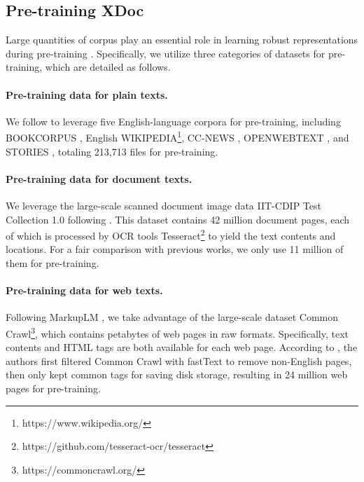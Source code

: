 \documentclass[11pt]{article}
\begin{document}
\subsection{Pre-training XDoc}
Large quantities of corpus play an essential role in learning robust representations during pre-training \cite{liu2019roberta}. Specifically, we utilize three categories of datasets for pre-training, which are detailed as follows.

\paragraph{Pre-training data for plain texts.} We follow \cite{liu2019roberta} to leverage five English-language corpora for pre-training, including B{\small OOK}C{\small ORPUS} \cite{zhu2015aligning}, English W{\small IKIPEDIA}\footnote{https://www.wikipedia.org/}, CC-N{\small EWS} \cite{ccnews}, O{\small PEN}W{\small EB}T{\small EXT} \cite{openweb}, and S{\small TORIES} \cite{trinh2018simple}, totaling 213,713 files for pre-training.

\paragraph{Pre-training data for document texts.} We leverage the large-scale scanned document image data IIT-CDIP Test Collection 1.0 \cite{lewis2006building} following \cite{xu2020layoutlm,xu2020layoutlmv2,huang2022layoutlmv3}. This dataset contains 42 million document pages, each of which is processed by OCR tools Tesseract\footnote{https://github.com/tesseract-ocr/tesseract} to yield the text contents and locations. For a fair comparison with previous works, we only use 11 million of them for pre-training.

\paragraph{Pre-training data for web texts.} Following MarkupLM \cite{li2021markuplm}, we take advantage of the large-scale dataset Common Crawl\footnote{https://commoncrawl.org/}, which contains petabytes of web pages in raw formats. Specifically, text contents and HTML tags are both available for each web page. According to \cite{li2021markuplm}, the authors first filtered Common Crawl with fastText \cite{bojanowski2017enriching} to remove non-English pages, then only kept common tags for saving disk storage, resulting in 24 million web pages for pre-training.
\end{document}
